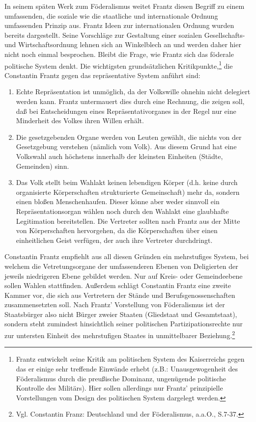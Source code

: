\documentclass[a4paper,12pt]{article}
\begin{document}
In seinem späten Werk zum Föderalismus weitet Frantz diesen Begriff
zu einem umfassenden, die soziale wie die staatliche und
internationale Ordnung umfassenden Prinzip aus. Frantz Ideen zur
internationalen Ordnung wurden bereits dargestellt. Seine
Vorschläge zur Gestaltung einer sozialen Gesellschafts- und
Wirtschaftsordnung lehnen sich an Winkelblech an und werden daher
hier nicht noch einmal besprochen. Bleibt die Frage, wie Frantz
sich das föderale politische System denkt. Die wichtigsten
grundsätzlichen Kritikpunkte,\footnote{Frantz entwickelt seine
Kritik am politischen System des Kaiserreichs gegen das er einige
sehr treffende Einwände erhebt (z.B.: Unausgewogenheit des Föderalismus
durch die preußische Dominanz, ungenügende politische Kontrolle des
Militärs). Hier sollen allerdings nur Frantz' prinzipielle
Vorstellungen vom Design des politischen System dargelegt werden.}
die Constantin Frantz gegen das repräsentative System anführt sind:
\begin{enumerate}

\item Echte Repräsentation ist unmöglich, da der Volkswille
ohnehin nicht delegiert werden kann. Frantz untermauert dies
durch eine Rechnung, die zeigen soll, daß bei Entscheidungen eines
Repräsentativorganes in der Regel nur eine Minderheit des
Volkes ihren Willen erhält. 

\item Die gesetzgebenden Organe werden von Leuten gewählt, die
nichts von der Gesetzgebung verstehen (nämlich vom Volk). Aus
diesem Grund hat eine Volkswahl auch höchstens innerhalb der
kleinsten Einheiten (Städte, Gemeinden) sinn.

\item Das Volk stellt beim Wahlakt keinen lebendigen Körper
(d.h. keine durch organisierte Körperschaften strukturierte
Gemeinschaft) mehr da, sondern einen bloßen Menschenhaufen. Dieser
könne aber weder sinnvoll ein Repräsentationsorgan wählen noch
durch den Wahlakt eine glaubhafte Legitimation bereitstellen. Die
Vertreter sollten nach Frantz aus der Mitte von Körperschaften
hervorgehen, da die Körperschaften über einen einheitlichen Geist
verfügen, der auch ihre Vertreter durchdringt.

\end{enumerate}

Constantin Frantz empfiehlt aus all diesen Gründen ein mehrstufiges
System, bei welchem die Vetretungsorgane der umfassenderen Ebenen
von Deligierten der jeweils niedrigeren Ebene gebildet werden. Nur
auf Kreis- oder Gemeindeebene sollen Wahlen stattfinden. Außerdem
schlägt Constantin Frantz eine zweite Kammer vor, die sich aus
Vertretern der Stände und Berufsgenossenschaften zusammensetzten
soll. Nach Frantz' Vorstellung von Föderalismus ist der
Staatsbürger also nicht Bürger zweier Staaten (Gliedstaat und
Gesamtstaat), sondern steht zumindest hinsichtlich seiner
politischen Partizipationsrechte nur zur untersten Einheit des
mehrstufigen Staates in unmittelbarer
Beziehung.\footnote{Vgl. Constantin Franz\cite{frantz-deutschland}:
Deutschland und der Föderalismus, a.a.O., S.7-37.}
\end{document}
